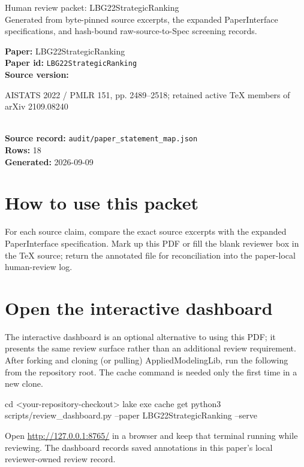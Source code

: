 \documentclass[10pt]{article}
\begin{document}
\fontsize{9}{10}\selectfont

\begin{center}
{\LARGE Human review packet: LBG22StrategicRanking}\\[0.35em]
\small Generated from byte-pinned source excerpts, the expanded PaperInterface
specifications, and hash-bound raw-source-to-Spec screening records.
\end{center}

\noindent\textbf{Paper:} LBG22StrategicRanking\\
\textbf{Paper id:} \texttt{LBG22StrategicRanking}\\
\textbf{Source version:} \parbox[t]{0.76\linewidth}{\raggedright AISTATS 2022 / PMLR 151, pp. 2489–2518; retained active TeX members of arXiv 2109.08240}\\
\textbf{Source record:} \texttt{audit/paper\_statement\_map.json}\\
\textbf{Rows:} 18\\
\textbf{Generated:} 2026-09-09





\section*{How to use this packet}
For each source claim, compare the exact source excerpts with the expanded
PaperInterface specification. Mark up this PDF or fill the blank reviewer box in the TeX source;
return the annotated file for reconciliation into the paper-local human-review
log.

\section*{Open the interactive dashboard}
The interactive dashboard is an optional alternative to using this PDF; it
presents the same review surface rather than an additional review requirement.
After forking and cloning (or pulling) AppliedModelingLib, run the following from the
repository root. The cache command is needed only the first time in a new clone.
\begin{ReviewVerbatim}
cd <your-repository-checkout>
lake exe cache get
python3 scripts/review_dashboard.py --paper LBG22StrategicRanking --serve
\end{ReviewVerbatim}
Open \url{http://127.0.0.1:8765/} in a browser and keep that terminal running
while reviewing. The dashboard records saved annotations in this paper's local
reviewer-owned review record.
\end{document}
